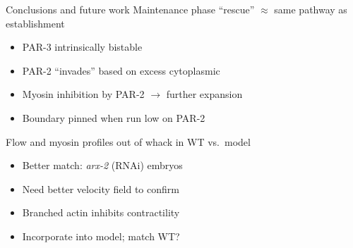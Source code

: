 \documentclass{beamer}
\newcommand{\6}[1]{#1_{\text{6}}}
\newcommand{\3}[1]{#1_{\text{3}}}
\begin{document}
\begin{frame}{Conclusions and future work}
Maintenance phase ``rescue'' $\approx$ same pathway as establishment
\begin{itemize}
\item PAR-3 intrinsically bistable
\item PAR-2 ``invades'' based on excess cytoplasmic
\item Myosin inhibition by PAR-2 $\rightarrow$ further expansion
\item Boundary pinned when run low on PAR-2
\end{itemize}
Flow and myosin profiles out of whack in WT vs.\ model
\begin{itemize}
\item Better match: \emph{arx-2} (RNAi) embryos 
\item Need better velocity field to confirm
\item Branched actin inhibits contractility
\item Incorporate into model; match WT?
\end{itemize} 
\end{frame}
\end{document}
